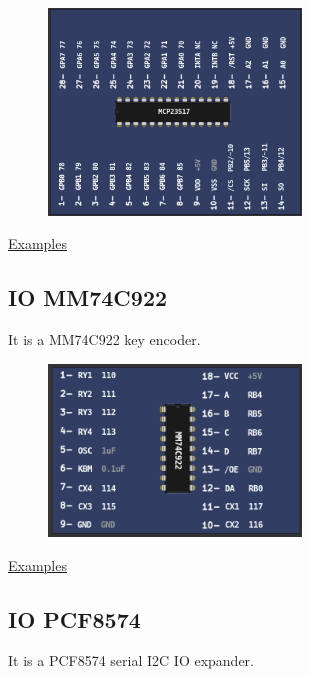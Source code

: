 \begin{figure}[H]
\center
\includegraphics[width=0.6\textwidth]{img/part_MCP23S17.png} 
\end{figure} 

\href{https://lcgamboa.github.io/picsimlab_examples/parts_IO_MCP23S17.html}{Examples}

\subsection{IO MM74C922}

It is a MM74C922 key encoder.

\begin{figure}[H]
\center
\includegraphics[width=0.6\textwidth]{img/part_MM74C922.png} 
\end{figure} 

\href{https://lcgamboa.github.io/picsimlab_examples/parts_IO_MM74C922.html}{Examples}

\vspace{0.5cm}

\subsection{IO PCF8574}

It is a PCF8574 serial I2C IO expander.

